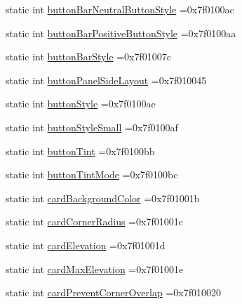 \begin{DoxyCompactItemize}
static int \hyperlink{classandroid_1_1support_1_1graphics_1_1drawable_1_1animated_1_1R_1_1attr_ac7f87033173fe60edad4f49150b4ac82}{button\+Bar\+Neutral\+Button\+Style} =0x7f0100ac
\item 
static int \hyperlink{classandroid_1_1support_1_1graphics_1_1drawable_1_1animated_1_1R_1_1attr_adb4645168706173464d5237c9e0edc0b}{button\+Bar\+Positive\+Button\+Style} =0x7f0100aa
\item 
static int \hyperlink{classandroid_1_1support_1_1graphics_1_1drawable_1_1animated_1_1R_1_1attr_a9aceb9b721f40d739d885e14c8f1538c}{button\+Bar\+Style} =0x7f01007c
\item 
static int \hyperlink{classandroid_1_1support_1_1graphics_1_1drawable_1_1animated_1_1R_1_1attr_a3884a22b7a795375843a60367a167f52}{button\+Panel\+Side\+Layout} =0x7f010045
\item 
static int \hyperlink{classandroid_1_1support_1_1graphics_1_1drawable_1_1animated_1_1R_1_1attr_af377ddf450b3731613ef19158d029db0}{button\+Style} =0x7f0100ae
\item 
static int \hyperlink{classandroid_1_1support_1_1graphics_1_1drawable_1_1animated_1_1R_1_1attr_ac9f384b8ef9b4dfe4f26f9d4d4f83372}{button\+Style\+Small} =0x7f0100af
\item 
static int \hyperlink{classandroid_1_1support_1_1graphics_1_1drawable_1_1animated_1_1R_1_1attr_a58e86b6d836adfadc10101909043e2ea}{button\+Tint} =0x7f0100bb
\item 
static int \hyperlink{classandroid_1_1support_1_1graphics_1_1drawable_1_1animated_1_1R_1_1attr_a5351d5e8e9287a0094f6bbbc9b1f6d81}{button\+Tint\+Mode} =0x7f0100bc
\item 
static int \hyperlink{classandroid_1_1support_1_1graphics_1_1drawable_1_1animated_1_1R_1_1attr_a169408e08b92ac7a63bc70a994c59ab7}{card\+Background\+Color} =0x7f01001b
\item 
static int \hyperlink{classandroid_1_1support_1_1graphics_1_1drawable_1_1animated_1_1R_1_1attr_a9897b4ca2973a656b743e14f96a236e2}{card\+Corner\+Radius} =0x7f01001c
\item 
static int \hyperlink{classandroid_1_1support_1_1graphics_1_1drawable_1_1animated_1_1R_1_1attr_af07d688429dc272f8356b80331ab87a1}{card\+Elevation} =0x7f01001d
\item 
static int \hyperlink{classandroid_1_1support_1_1graphics_1_1drawable_1_1animated_1_1R_1_1attr_a85c2f2fa47273fdc9b75776cb2ed9f5c}{card\+Max\+Elevation} =0x7f01001e
\item 
static int \hyperlink{classandroid_1_1support_1_1graphics_1_1drawable_1_1animated_1_1R_1_1attr_a54b646b4bbdaa811ed9df5da31b57506}{card\+Prevent\+Corner\+Overlap} =0x7f010020

\end{DoxyCompactItemize}
